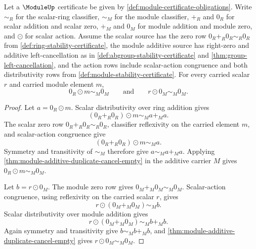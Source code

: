 \begin{theorem}
\label{thm:module-zero-action-annihilation}
Let a $\ModuleUp$ certificate be given by \autoref{def:module-certificate-obligations}. Write $\sim_R$ for the scalar-ring classifier, $\sim_M$ for the module classifier, $+_R$ and $0_R$ for scalar addition and scalar zero, $+_M$ and $0_M$ for module addition and module zero, and $\odot$ for scalar action. Assume the scalar source has the zero row $0_R+_R0_R\sim_R0_R$ from \autoref{def:ring-stability-certificate}, the module additive source has right-zero and additive left-cancellation as in \autoref{def:abgroup-stability-certificate} and \autoref{thm:group-left-cancellation}, and the action rows include scalar-action congruence and both distributivity rows from \autoref{def:module-stability-certificate}. For every carried scalar $r$ and carried module element $m$,
$$
0_R\odot m\sim_M0_M
\qquad\text{and}\qquad
r\odot0_M\sim_M0_M.
$$
\end{theorem}
\begin{proof}
Let $a=0_R\odot m$. Scalar distributivity over ring addition gives
$$
(0_R+_R0_R)\odot m\sim_M a+_M a.
$$
The scalar zero row $0_R+_R0_R\sim_R0_R$, classifier reflexivity on the carried element $m$, and scalar-action congruence give
$$
(0_R+_R0_R)\odot m\sim_M a.
$$
Symmetry and transitivity of $\sim_M$ therefore give $a\sim_M a+_M a$. Applying \autoref{thm:module-additive-duplicate-cancel-empty} in the additive carrier $M$ gives $0_R\odot m\sim_M0_M$.

Let $b=r\odot0_M$. The module zero row gives $0_M+_M0_M\sim_M0_M$. Scalar-action congruence, using reflexivity on the carried scalar $r$, gives
$$
r\odot(0_M+_M0_M)\sim_M b.
$$
Scalar distributivity over module addition gives
$$
r\odot(0_M+_M0_M)\sim_M b+_M b.
$$
Again symmetry and transitivity give $b\sim_M b+_M b$, and \autoref{thm:module-additive-duplicate-cancel-empty} gives $r\odot0_M\sim_M0_M$.
\end{proof}








